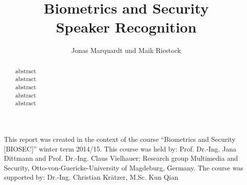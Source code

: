 \documentclass{acmtog}
\begin{document}
\title{Biometrics and Security\\ Speaker Recognition} 

\author{Jonas Marquardt {\upshape und} Maik Riestock
}




\maketitle

\begin{bottomstuff}
This report was created in the context of the course “Biometrics and Security [BIOSEC]” winter term 2014/15.
This course was held by: Prof. Dr.-Ing. Jana Dittmann and Prof. Dr.-Ing. Claus Vielhauer; Research group Multimedia and Security, Otto-von-Guericke-University of Magdeburg, Germany.
The course was supported by: Dr.-Ing. Christian Krätzer, M.Sc. Kun Qian
\end{bottomstuff}


\begin{abstract}
abstract\\
abstract\\
abstract\\
abstract\\
abstract\\

\end{abstract}



\listoftables

\appendix


\end{document}

